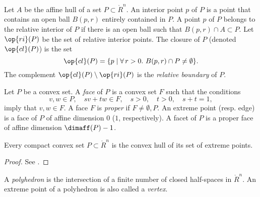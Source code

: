 \begin{definition} Let $A$ be the affine hull of a set $P\subset\ring{R}^n$.    An interior point $p$ of $P$ is a point that contains an open ball $B(p,r)$ entirely contained in $P$.  A point $p$ of $P$ belongs to the relative interior of $P$ if there is an open ball such that $B(p,r) \cap A\subset P$.  Let $\op{ri}(P)$ be the set of relative interior points.  The closure of $P$ (denoted $\op{cl}(P)$)  is the set
$$
\op{cl}(P) = \{p \mid \forall\,r >0.~ B(p,r) \cap P \ne \emptyset\}.
$$
The complement $\op{cl}(P)\setminus \op{ri}(P)$ is the {\it relative boundary} of $P$.
\end{definition}
%
%
%
%
%
%
%

\begin{definition}
Let $P$ be a convex set.  A {\it face} of $P$ is a convex set $F$ such that the conditions
$$
v,w\in P,\quad s v + t w \in F,\quad s>0,\quad t>0,\quad s+t = 1,
$$ 
imply that $v,w\in F$.  A face $F$ is {\it proper} if $F\ne \emptyset,P$.    An extreme point (resp. edge) is a face of $P$ of affine dimension $0$ ($1$, respectively).   A facet of $P$ is a proper face of affine dimension $\dimaff(P)-1$.
%
%
%
%
%
\end{definition}


\begin{lemma} Every compact convex set $P\subset\ring{R}^n$ is the convex hull of its set of extreme points.
\end{lemma}

\begin{proof}  See \cite[Theorem~2.6.16]{webster:1994}.
\end{proof}


\begin{definition}  A {\it polyhedron} is the intersection of
a finite number of closed half-spaces in $\ring{R}^n$.  An extreme point of a polyhedron is also called a {\it vertex}.
\end{definition}
%

